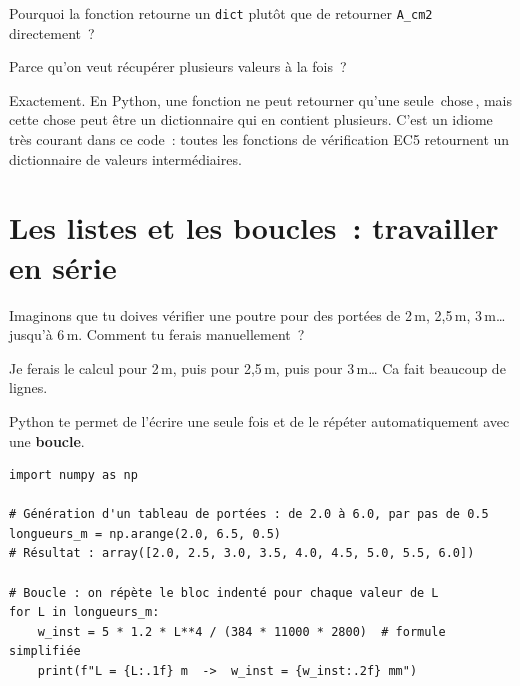 \documentclass[12pt, a4paper, openany]{book}
\newcommand{\py}[1]{\texttt{#1}}
\begin{document}
\begin{maitre}
Pourquoi la fonction retourne un \py{dict} plut\^ot que de retourner
\py{A\_cm2} directement~?
\end{maitre}

\begin{apprenti}
Parce qu'on veut r\'ecup\'erer plusieurs valeurs \`a la fois~?
\end{apprenti}

\begin{maitre}
Exactement. En Python, une fonction ne peut retourner qu'une seule
\guillemotleft\,chose\,\guillemotright, mais cette chose peut \^etre un
dictionnaire qui en contient plusieurs. C'est un idiome tr\`es courant
dans ce code~: toutes les fonctions de v\'erification EC5 retournent
un dictionnaire de valeurs interm\'ediaires.
\end{maitre}

\section{Les listes et les boucles~: travailler en s\'erie}

\begin{maitre}
Imaginons que tu doives v\'erifier une poutre pour des port\'ees de
2\,m, 2,5\,m, 3\,m\ldots{} jusqu'\`a 6\,m. Comment tu ferais manuellement~?
\end{maitre}

\begin{apprenti}
Je ferais le calcul pour 2\,m, puis pour 2,5\,m, puis pour 3\,m\ldots{}
Ca fait beaucoup de lignes.
\end{apprenti}

\begin{maitre}
Python te permet de l'\'ecrire une seule fois et de le r\'ep\'eter
automatiquement avec une \textbf{boucle}.
\end{maitre}

\begin{lstlisting}[style=python, caption={Boucle sur une liste de portées}]
import numpy as np

# Génération d'un tableau de portées : de 2.0 à 6.0, par pas de 0.5
longueurs_m = np.arange(2.0, 6.5, 0.5)
# Résultat : array([2.0, 2.5, 3.0, 3.5, 4.0, 4.5, 5.0, 5.5, 6.0])

# Boucle : on répète le bloc indenté pour chaque valeur de L
for L in longueurs_m:
    w_inst = 5 * 1.2 * L**4 / (384 * 11000 * 2800)  # formule simplifiée
    print(f"L = {L:.1f} m  ->  w_inst = {w_inst:.2f} mm")
\end{lstlisting}
\end{document}
